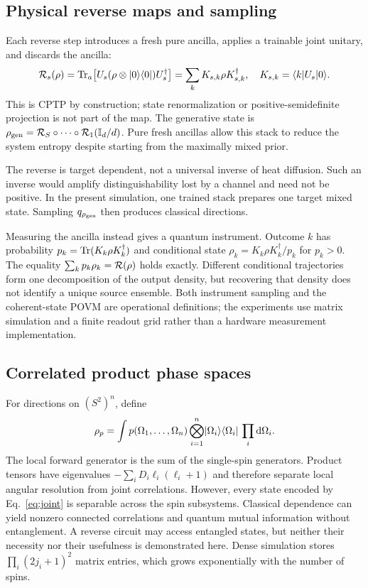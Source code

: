 \subsection{Physical reverse maps and sampling}
Each reverse step introduces a fresh pure ancilla, applies a trainable joint unitary, and discards the ancilla:
\begin{equation}
 \mathcal{R}_s(\rho)=\operatorname{Tr}_a\!\left[U_s(\rho\otimes\lvert 0\rangle\langle 0\rvert)U_s^\dagger\right]
 =\sum_kK_{s,k}\rho K_{s,k}^\dagger,\quad K_{s,k}=\langle k\rvert U_s\lvert 0\rangle.
 \label{eq:reverse}
\end{equation}
This is CPTP by construction; state renormalization or positive-semidefinite projection is not part of the map. The generative state is $\rho_{\rm gen}=\mathcal{R}_S\circ\cdots\circ\mathcal{R}_1(\mathbb{I}_d/d)$. Pure fresh ancillas allow this stack to reduce the system entropy despite starting from the maximally mixed prior.

The reverse is target dependent, not a universal inverse of heat diffusion. Such an inverse would amplify distinguishability lost by a channel and need not be positive. In the present simulation, one trained stack prepares one target mixed state. Sampling $q_{\rho_{\rm gen}}$ then produces classical directions.

Measuring the ancilla instead gives a quantum instrument. Outcome $k$ has probability $p_k=\operatorname{Tr}(K_k\rho K_k^\dagger)$ and conditional state $\rho_k=K_k\rho K_k^\dagger/p_k$ for $p_k>0$. The equality $\sum_kp_k\rho_k=\mathcal{R}(\rho)$ holds exactly. Different conditional trajectories form one decomposition of the output density, but recovering that density does not identify a unique source ensemble. Both instrument sampling and the coherent-state POVM are operational definitions; the experiments use matrix simulation and a finite readout grid rather than a hardware measurement implementation.

\subsection{Correlated product phase spaces}
For directions on $(S^2)^n$, define
\begin{equation}
 \rho_p=\int p(\Omega_1,\ldots,\Omega_n)
 \bigotimes_{i=1}^n\lvert \Omega_i\rangle\langle \Omega_i\rvert\,\prod_i\mathrm{d}\Omega_i.
 \label{eq:joint}
\end{equation}
The local forward generator is the sum of the single-spin generators. Product tensors have eigenvalues $-\sum_iD_i\ell_i(\ell_i+1)$ and therefore separate local angular resolution from joint correlations. However, every state encoded by Eq.~\eqref{eq:joint} is separable across the spin subsystems. Classical dependence can yield nonzero connected correlations and quantum mutual information without entanglement. A reverse circuit may access entangled states, but neither their necessity nor their usefulness is demonstrated here. Dense simulation stores $\prod_i(2j_i+1)^2$ matrix entries, which grows exponentially with the number of spins.
